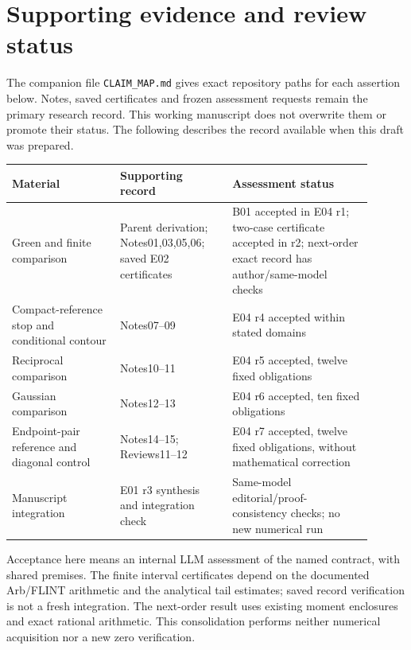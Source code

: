 \section{Supporting evidence and review status}\label{sec:provenance}
The companion file \texttt{CLAIM\_MAP.md} gives exact repository paths
for each assertion below. Notes, saved certificates and frozen assessment
requests remain the primary research record. This working manuscript
does not overwrite them or promote their status. The following describes
the record available when this draft was prepared.

\begin{center}\small
\begin{tabular}{>{\raggedright\arraybackslash}p{0.27\linewidth}>{\raggedright\arraybackslash}p{0.28\linewidth}>{\raggedright\arraybackslash}p{0.35\linewidth}}
\toprule
Material & Supporting record & Assessment status \\
\midrule
Green and finite comparison & Parent derivation; Notes01,03,05,06; saved E02 certificates & B01 accepted in E04 r1; two-case certificate accepted in r2; next-order exact record has author/same-model checks \\
Compact-reference stop and conditional contour & Notes07--09 & E04 r4 accepted within stated domains \\
Reciprocal comparison & Notes10--11 & E04 r5 accepted, twelve fixed obligations \\
Gaussian comparison & Notes12--13 & E04 r6 accepted, ten fixed obligations \\
Endpoint-pair reference and diagonal control & Notes14--15; Reviews11--12 & E04 r7 accepted, twelve fixed obligations, without mathematical correction \\
Manuscript integration & E01 r3 synthesis and integration check & Same-model editorial/proof-consistency checks; no new numerical run \\
\bottomrule
\end{tabular}
\end{center}

Acceptance here means an internal LLM assessment of the named contract,
with shared premises. The finite interval certificates depend on the
documented Arb/FLINT arithmetic and the analytical tail estimates; saved
record verification is not a fresh integration. The next-order result
uses existing moment enclosures and exact rational arithmetic. This
consolidation performs neither numerical acquisition nor a new zero
verification.

